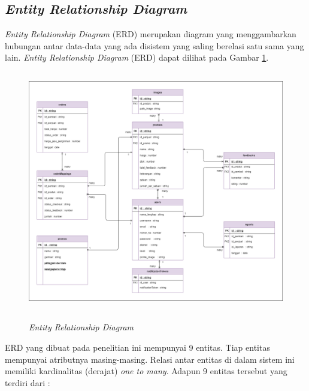 \subsection{\textit{Entity Relationship Diagram}}
\textit{Entity Relationship Diagram} (ERD) merupakan diagram yang menggambarkan hubungan antar data-data yang ada disistem yang saling berelasi satu sama yang lain. \textit{Entity Relationship Diagram} (ERD) dapat dilihat pada Gambar \ref{erd}.

\begin{figure}[H]
	\centering
	{\includegraphics [width = 14.3cm, height= 10.5cm]{gambar/erd}}
	\caption{\textit{Entity Relationship Diagram}}
	\label{erd}
\end{figure}

ERD yang dibuat pada penelitian ini mempunyai 9 entitas. Tiap entitas mempunyai atributnya masing-masing. Relasi antar entitas di dalam sistem ini memiliki kardinalitas (derajat) \textit{one to many}.  Adapun 9 entitas tersebut yang terdiri dari :

